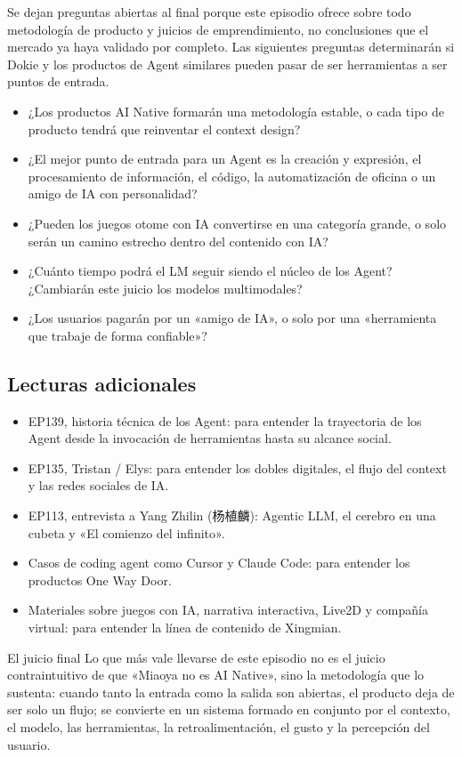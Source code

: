 \documentclass[a4paper]{article}
\begin{document}
Se dejan preguntas abiertas al final porque este episodio ofrece sobre todo metodología de producto y juicios de emprendimiento, no conclusiones que el mercado ya haya validado por completo. Las siguientes preguntas determinarán si Dokie y los productos de Agent similares pueden pasar de ser herramientas a ser puntos de entrada.

\begin{itemize}
\item ¿Los productos AI Native formarán una metodología estable, o cada tipo de producto tendrá que reinventar el context design?
\item ¿El mejor punto de entrada para un Agent es la creación y expresión, el procesamiento de información, el código, la automatización de oficina o un amigo de IA con personalidad?
\item ¿Pueden los juegos otome con IA convertirse en una categoría grande, o solo serán un camino estrecho dentro del contenido con IA?
\item ¿Cuánto tiempo podrá el LM seguir siendo el núcleo de los Agent? ¿Cambiarán este juicio los modelos multimodales?
\item ¿Los usuarios pagarán por un «amigo de IA», o solo por una «herramienta que trabaje de forma confiable»?
\end{itemize}

\subsection{Lecturas adicionales}

\begin{itemize}
\item EP139, historia técnica de los Agent: para entender la trayectoria de los Agent desde la invocación de herramientas hasta su alcance social.
\item EP135, Tristan / Elys: para entender los dobles digitales, el flujo del context y las redes sociales de IA.
\item EP113, entrevista a Yang Zhilin (杨植麟): Agentic LLM, el cerebro en una cubeta y «El comienzo del infinito».
\item Casos de coding agent como Cursor y Claude Code: para entender los productos One Way Door.
\item Materiales sobre juegos con IA, narrativa interactiva, Live2D y compañía virtual: para entender la línea de contenido de Xingmian.
\end{itemize}

\begin{importantbox}{El juicio final}
Lo que más vale llevarse de este episodio no es el juicio contraintuitivo de que «Miaoya no es AI Native», sino la metodología que lo sustenta: cuando tanto la entrada como la salida son abiertas, el producto deja de ser solo un flujo; se convierte en un sistema formado en conjunto por el contexto, el modelo, las herramientas, la retroalimentación, el gusto y la percepción del usuario.
\end{importantbox}
\end{document}
